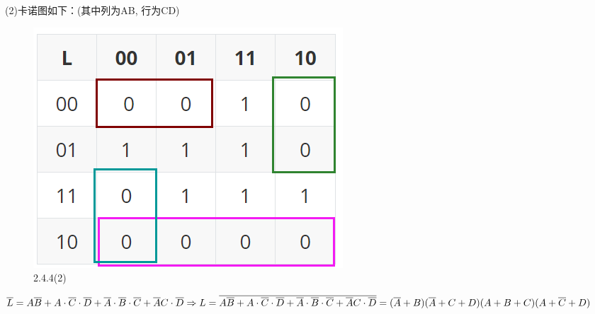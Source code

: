 \documentclass[a4paper,11pt,UTF8]{article}
\begin{document}
(2)卡诺图如下：(其中列为AB, 行为CD)
\begin{figure}[H] 
	\centering 
	\includegraphics[scale=0.30]{SD2.4.4_2.png}
	\caption{2.4.4(2)}
\end{figure}
\noindent$\overline{L}=A\overline{B}+A\cdot\overline{C}\cdot\overline{D}+\overline{A}\cdot\overline{B}\cdot\overline{C}+\overline{A}C\cdot\overline{D}\\\Rightarrow L=\overline{A\overline{B}+A\cdot\overline{C}\cdot\overline{D}+\overline{A}\cdot\overline{B}\cdot\overline{C}+\overline{A}C\cdot\overline{D}}=(\overline{A}+B)(\overline{A}+C+D)(A+B+C)(A+\overline{C}+D)$
\end{document}
